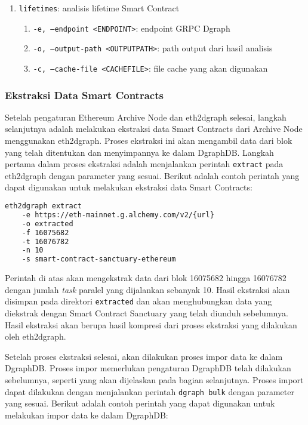 \begin{enumerate}
\begin{enumerate}
\begin{enumerate}
		            \end{enumerate}
		      \item \texttt{lifetimes}: analisis lifetime Smart Contract
		            \begin{enumerate}
			            \item \texttt{-e, --endpoint <ENDPOINT>}: endpoint GRPC Dgraph
			            \item \texttt{-o, --output-path <OUTPUT\textunderscore PATH>}: path output dari hasil analisis
			            \item \texttt{-c, --cache-file <CACHE\textunderscore FILE>}: file cache yang akan digunakan
		            \end{enumerate}
	      \end{enumerate}
\end{enumerate}

\subsubsection{Ekstraksi Data Smart Contracts}

Setelah pengaturan Ethereum Archive Node dan eth2dgraph selesai, langkah selanjutnya adalah melakukan ekstraksi data Smart Contracts dari Archive Node menggunakan eth2dgraph. Proses ekstraksi ini akan mengambil data dari blok yang telah ditentukan dan menyimpannya ke dalam DgraphDB. Langkah pertama dalam proses ekstraksi adalah menjalankan perintah \texttt{extract} pada eth2dgraph dengan parameter yang sesuai. Berikut adalah contoh perintah yang dapat digunakan untuk melakukan ekstraksi data Smart Contracts:

\begin{lstlisting}[language=bash]
    eth2dgraph extract 
    -e https://eth-mainnet.g.alchemy.com/v2/{url}
    -o extracted 
    -f 16075682 
    -t 16076782 
    -n 10 
    -s smart-contract-sanctuary-ethereum
\end{lstlisting}

Perintah di atas akan mengekstrak data dari blok 16075682 hingga 16076782 dengan jumlah \textit{task} paralel yang dijalankan sebanyak 10. Hasil ekstraksi akan disimpan pada direktori \texttt{extracted} dan akan menghubungkan data yang diekstrak dengan Smart Contract Sanctuary yang telah diunduh sebelumnya. Hasil ekstraksi akan berupa hasil kompresi dari proses ekstraksi yang dilakukan oleh eth2dgraph.

Setelah proses ekstraksi selesai, akan dilakukan proses impor data ke dalam DgraphDB. Proses impor memerlukan pengaturan DgraphDB telah dilakukan sebelumnya, seperti yang akan dijelaskan pada bagian selanjutnya. Proses import dapat dilakukan dengan menjalankan perintah \texttt{dgraph bulk} dengan parameter yang sesuai. Berikut adalah contoh perintah yang dapat digunakan untuk melakukan impor data ke dalam DgraphDB:

